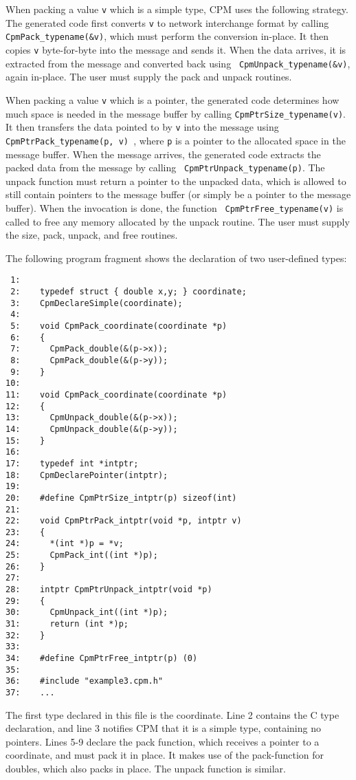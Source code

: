 When packing a value {\tt v} which is a simple type, CPM uses the
following strategy.  The generated code first converts {\tt v} to
network interchange format by calling {\tt CpmPack\_typename(\&v)},
which must perform the conversion in-place.  It then copies {\tt v}
byte-for-byte into the message and sends it.  When the data arrives,
it is extracted from the message and converted back using {\tt
CpmUnpack\_typename(\&v)}, again in-place.  The user must supply the
pack and unpack routines.

When packing a value {\tt v} which is a pointer, the generated code
determines how much space is needed in the message buffer by calling
{\tt CpmPtrSize\_typename(v)}.  It then transfers the data pointed to
by {\tt v} into the message using {\tt CpmPtrPack\_typename(p, v) },
where {\tt p} is a pointer to the allocated space in the message
buffer.  When the message arrives, the generated code extracts the
packed data from the message by calling {\tt
CpmPtrUnpack\_typename(p)}.  The unpack function must return a pointer
to the unpacked data, which is allowed to still contain pointers to
the message buffer (or simply be a pointer to the message buffer).
When the invocation is done, the function {\tt
CpmPtrFree\_typename(v)} is called to free any memory allocated by the
unpack routine. The user must supply the size, pack, unpack, and free
routines.

The following program fragment shows the declaration of two
user-defined types:

\begin{verbatim}
 1:
 2:    typedef struct { double x,y; } coordinate;    
 3:    CpmDeclareSimple(coordinate);
 4:    
 5:    void CpmPack_coordinate(coordinate *p)
 6:    {
 7:      CpmPack_double(&(p->x));
 8:      CpmPack_double(&(p->y));
 9:    }
10:
11:    void CpmPack_coordinate(coordinate *p)
12:    {
13:      CpmUnpack_double(&(p->x));
14:      CpmUnpack_double(&(p->y));
15:    }
16:
17:    typedef int *intptr;
18:    CpmDeclarePointer(intptr);
19:
20:    #define CpmPtrSize_intptr(p) sizeof(int)
21:    
22:    void CpmPtrPack_intptr(void *p, intptr v)
23:    {
24:      *(int *)p = *v;
25:      CpmPack_int((int *)p);
26:    }
27:
28:    intptr CpmPtrUnpack_intptr(void *p)
29:    {
30:      CpmUnpack_int((int *)p);
31:      return (int *)p;
32:    }
33:
34:    #define CpmPtrFree_intptr(p) (0)
35:
36:    #include "example3.cpm.h"
37:    ...
\end{verbatim}

The first type declared in this file is the coordinate.  Line 2
contains the C type declaration, and line 3 notifies CPM that it is a
simple type, containing no pointers.  Lines 5-9 declare the pack
function, which receives a pointer to a coordinate, and must pack it
in place.  It makes use of the pack-function for doubles, which also
packs in place.  The unpack function is similar.


